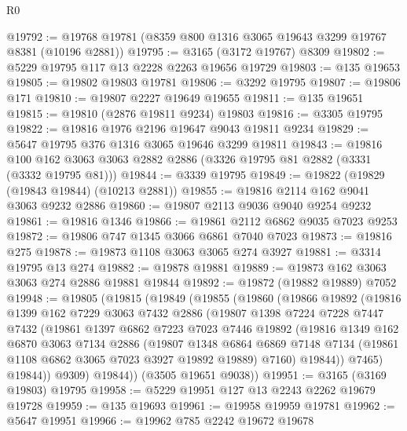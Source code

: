 \begin{lexlean}{R0}
\begin{coremodule}
@19792 := @19768 @19781 (@8359 @800 @1316 @3065 @19643 @3299 @19767 @8381 (@10196 @2881))
@19795 := @3165 (@3172 @19767) @8309
@19802 := @5229 @19795 @117 @13 @2228 @2263 @19656 @19729
@19803 := @135 @19653
@19805 := @19802 @19803 @19781
@19806 := @3292 @19795
@19807 := @19806 @171
@19810 := @19807 @2227 @19649 @19655
@19811 := @135 @19651
@19815 := @19810 (@2876 @19811 @9234) @19803
@19816 := @3305 @19795
@19822 := @19816 @1976 @2196 @19647 @9043 @19811 @9234
@19829 := @5647 @19795 @376 @1316 @3065 @19646 @3299 @19811
@19843 := @19816
    @100
    @162
    @3063
    @3063
    @2882
    @2886
    (@3326 @19795 @81 @2882 (@3331 (@3332 @19795 @81)))
@19844 := @3339 @19795
@19849 := @19822 (@19829 (@19843 @19844) (@10213 @2881))
@19855 := @19816 @2114 @162 @9041 @3063 @9232 @2886
@19860 := @19807 @2113 @9036 @9040 @9254 @9232
@19861 := @19816 @1346
@19866 := @19861 @2112 @6862 @9035 @7023 @9253
@19872 := @19806 @747 @1345 @3066 @6861 @7040 @7023
@19873 := @19816 @275
@19878 := @19873 @1108 @3063 @3065 @274 @3927
@19881 := @3314 @19795 @13 @274
@19882 := @19878 @19881
@19889 := @19873 @162 @3063 @3063 @274 @2886 @19881 @19844
@19892 := @19872 (@19882 @19889) @7052
@19948 := @19805
    (@19815
      (@19849
        (@19855
          (@19860
            (@19866
              @19892
              (@19816
                @1399
                @162
                @7229
                @3063
                @7432
                @2886
                (@19807
                  @1398
                  @7224
                  @7228
                  @7447
                  @7432
                  (@19861
                    @1397
                    @6862
                    @7223
                    @7023
                    @7446
                    @19892
                    (@19816
                      @1349
                      @162
                      @6870
                      @3063
                      @7134
                      @2886
                      (@19807
                        @1348
                        @6864
                        @6869
                        @7148
                        @7134
                        (@19861 @1108 @6862 @3065 @7023 @3927 @19892 @19889)
                        @7160)
                      @19844))
                  @7465)
                @19844))
            @9309)
          @19844))
      (@3505 @19651 @9038))
@19951 := @3165 (@3169 @19803) @19795
@19958 := @5229 @19951 @127 @13 @2243 @2262 @19679 @19728
@19959 := @135 @19693
@19961 := @19958 @19959 @19781
@19962 := @5647 @19951
@19966 := @19962 @785 @2242 @19672 @19678

\end{coremodule}
\end{lexlean}
